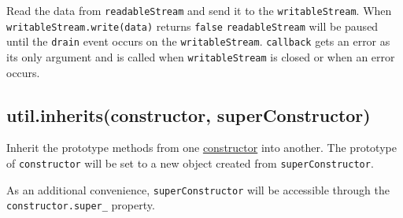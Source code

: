 \begin{Shaded}
\begin{Highlighting}[]
\NormalTok{: } \NormalTok{- }
\end{Highlighting}
\end{Shaded}

Read the data from \texttt{readableStream} and send it to the
\texttt{writableStream}. When \texttt{writableStream.write(data)}
returns \texttt{false} \texttt{readableStream} will be paused until the
\texttt{drain} event occurs on the \texttt{writableStream}.
\texttt{callback} gets an error as its only argument and is called when
\texttt{writableStream} is closed or when an error occurs.

\subsection{util.inherits(constructor, superConstructor)}

Inherit the prototype methods from one
\href{https://developer.mozilla.org/en/JavaScript/Reference/Global\_Objects/Object/constructor}{constructor}
into another. The prototype of \texttt{constructor} will be set to a new
object created from \texttt{superConstructor}.

As an additional convenience, \texttt{superConstructor} will be
accessible through the \texttt{constructor.super\_} property.

